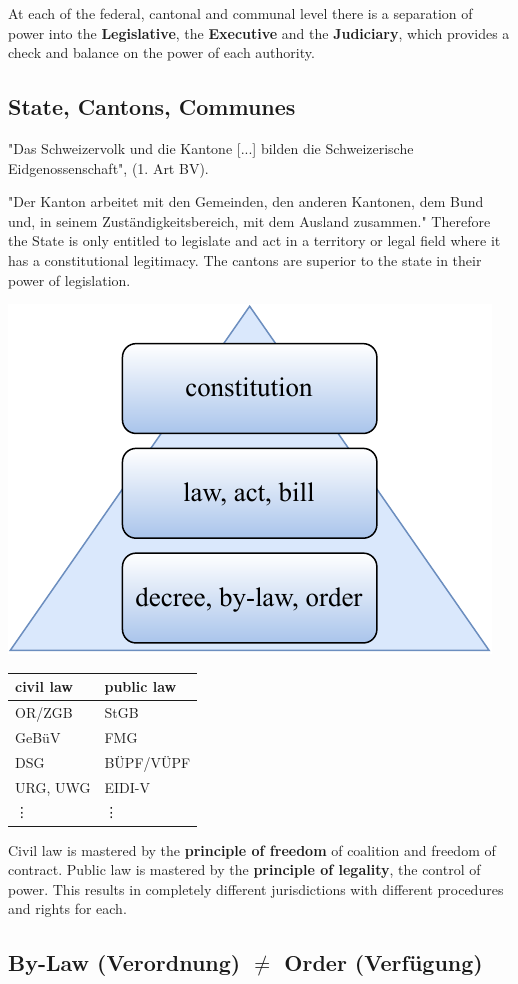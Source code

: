 \documentclass[11pt]{article}
\theoremstyle{definition}
\begin{document}
At each of the federal, cantonal and communal level there is a separation of power into the \textbf{Legislative}, the \textbf{Executive} and the \textbf{Judiciary}, which provides a check and balance on the power of each authority.

\subsection{State, Cantons, Communes}

"Das Schweizervolk und die Kantone [...] bilden die Schweizerische Eidgenossenschaft", (1. Art BV).

"Der Kanton arbeitet mit den Gemeinden, den anderen Kantonen, dem Bund und, in seinem Zuständigkeitsbereich, mit dem Ausland zusammen." Therefore the State is only entitled to legislate and act in a territory or legal field where it has a constitutional legitimacy. The cantons are superior to the state in their power of legislation.

\begin{center}
	\includegraphics[width=0.4\linewidth,keepaspectratio]{law_hierarchy}
\end{center}

\begin{tabularx}{\linewidth}{X|X}
	\textbf{civil law} & \textbf{public law}\\
	\hline
	OR/ZGB & StGB\\
	GeBüV & FMG\\
	DSG & BÜPF/VÜPF\\
	URG, UWG & EIDI-V\\
	\vdots & \vdots
\end{tabularx}

Civil law is mastered by the \textbf{principle of freedom} of coalition and freedom of contract. Public law is mastered by the \textbf{principle of legality}, the control of power. This results in completely different jurisdictions with different procedures and rights for each.

\subsection{By-Law (Verordnung) $\neq$ Order (Verfügung)}
\end{document}
